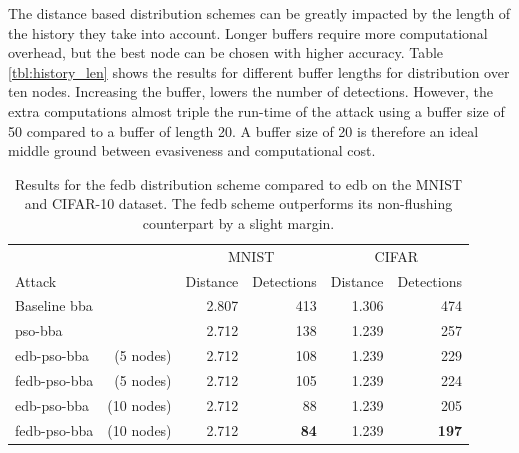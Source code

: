 The distance based distribution schemes can be greatly impacted by the length of the history they take into account. Longer buffers require more computational overhead, but the best node can be chosen with higher accuracy. Table \ref{tbl:history_len} shows the results for different buffer lengths for distribution over ten nodes. Increasing the buffer, lowers the number of detections. However, the extra computations almost triple the run-time of the attack using a buffer size of 50 compared to a buffer of length 20. A buffer size of 20 is therefore an ideal middle ground between evasiveness and computational cost.\\

\begin{table}
\centering
\caption[Flushing-Embedded-Distance-Based distribution results]{Results for the \gls{fedb} distribution scheme compared to \gls{edb} on the MNIST and CIFAR-10 dataset. The \gls{fedb} scheme outperforms its non-flushing counterpart by a slight margin.}
\label{tbl:resetting_db}
	\begin{tabular}{lrrrrr}\toprule
			&& \multicolumn{2}{c}{MNIST} &\multicolumn{2}{c}{CIFAR} \\ \cmidrule(r){3-4} \cmidrule(r){5-6}
	Attack				&&Distance	&Detections	&Distance	&Detections \\ \midrule
	Baseline \gls{bba}							&&2.807	&413	&1.306	&474 \\
	\gls{pso}-\gls{bba} 						&&2.712	&138	&1.239	&257 \\ \addlinespace[\linespace]
	\gls{edb}-\gls{pso}-\gls{bba} &(5 nodes)	&2.712	&108		&1.239	&229 \\
	\gls{fedb}-\gls{pso}-\gls{bba} &(5 nodes)	&2.712	&105		&1.239	&224 \\ \addlinespace[\linespace]
	\gls{edb}-\gls{pso}-\gls{bba} &(10 nodes)	&2.712	&88		&1.239	&205 \\
	\gls{fedb}-\gls{pso}-\gls{bba} &(10 nodes)	&2.712	&\textbf{84}		&1.239	&\textbf{197} \\
	\bottomrule
	\end{tabular}
\end{table}

